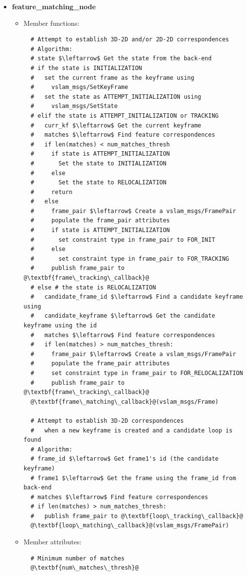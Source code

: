 \begin{itemize}
  \item \textbf{feature\_matching\_node}
  \begin{itemize}
    \item Member functions:
\begin{lstlisting}
  # Attempt to establish 3D-2D and/or 2D-2D correspondences
  # Algorithm:
  # state $\leftarrow$ Get the state from the back-end
  # if the state is INITIALIZATION
  #   set the current frame as the keyframe using 
  #     vslam_msgs/SetKeyFrame
  #   set the state as ATTEMPT_INITIALIZATION using 
  #     vslam_msgs/SetState
  # elif the state is ATTEMPT_INITIALIZATION or TRACKING
  #   curr_kf $\leftarrow$ Get the current keyframe
  #   matches $\leftarrow$ Find feature correspondences 
  #   if len(matches) < num_matches_thresh
  #     if state is ATTEMPT_INITIALIZATION
  #       Set the state to INITIALIZATION
  #     else
  #       Set the state to RELOCALIZATION
  #     return
  #   else
  #     frame_pair $\leftarrow$ Create a vslam_msgs/FramePair 
  #     populate the frame_pair attributes 
  #     if state is ATTEMPT_INITIALIZATION
  #       set constraint type in frame_pair to FOR_INIT
  #     else
  #       set constraint type in frame_pair to FOR_TRACKING
  #     publish frame_pair to @\textbf{frame\_tracking\_callback}@
  # else # the state is RELOCALIZATION
  #   candidate_frame_id $\leftarrow$ Find a candidate keyframe using
  #   candidate_keyframe $\leftarrow$ Get the candidate keyframe using the id
  #   matches $\leftarrow$ Find feature correspondences
  #   if len(matches) > num_matches_thresh:
  #     frame_pair $\leftarrow$ Create a vslam_msgs/FramePair 
  #     populate the frame_pair attributes 
  #     set constraint type in frame_pair to FOR_RELOCALIZATION
  #     publish frame_pair to @\textbf{frame\_tracking\_callback}@
  @\textbf{frame\_matching\_callback}@(vslam_msgs/Frame) 

  # Attempt to establish 3D-2D correspondences
  #   when a new keyframe is created and a candidate loop is found
  # Algorithm:
  # frame_id $\leftarrow$ Get frame1's id (the candidate keyframe)
  # frame1 $\leftarrow$ Get the frame using the frame_id from back-end
  # matches $\leftarrow$ Find feature correspondences
  # if len(matches) > num_matches_thresh:
  #   publish frame_pair to @\textbf{loop\_tracking\_callback}@
  @\textbf{loop\_matching\_callback}@(vslam_msgs/FramePair)
\end{lstlisting}

    \item Member attributes:
\begin{lstlisting}
  # Minimum number of matches
  @\textbf{num\_matches\_thresh}@
\end{lstlisting}
  \end{itemize}  


\end{itemize}
